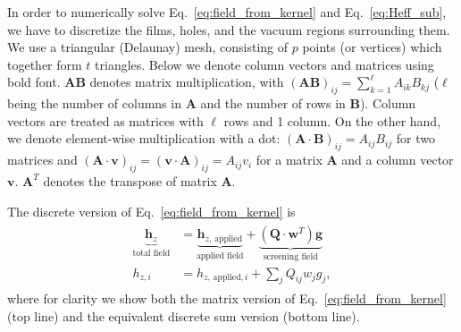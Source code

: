 \documentclass[final,3p,times,twocolumn]{elsarticle}
\begin{document}
In order to numerically solve Eq.~\ref{eq:field_from_kernel} and Eq.~\ref{eq:Heff_sub}, we have to discretize the films, holes, and the vacuum regions surrounding them. We use a triangular
(Delaunay) mesh, consisting of $p$ points (or vertices)
which together form $t$ triangles. Below we denote column vectors and matrices using bold font. $\mathbf{A}\mathbf{B}$
denotes matrix multiplication, with $(\mathbf{A}\mathbf{B})_{ij}=\sum_{k=1}^\ell A_{ik}B_{kj}$
($\ell$ being the number of columns in $\mathbf{A}$ and the number of rows in $\mathbf{B}$). Column vectors are treated as matrices with $\ell$ rows and 1 column. On the other hand, we denote element-wise multiplication with a dot: $(\mathbf{A}\cdot\mathbf{B})_{ij}=A_{ij}B_{ij}$ for two matrices
and $(\mathbf{A}\cdot\mathbf{v})_{ij}=(\mathbf{v}\cdot\mathbf{A})_{ij}=A_{ij}v_{i}$ for a matrix $\mathbf{A}$ and a column vector $\mathbf{v}$. $\mathbf{A}^T$ denotes the transpose of matrix $\mathbf{A}$.

The discrete version of Eq.~\ref{eq:field_from_kernel} is
\begin{align}
\begin{split}
    \label{eq:field_from_kernel_num}
    \underbrace{\mathbf{h}_z}_\text{total field}
    &= \underbrace{\mathbf{h}_{z,\,\mathrm{applied}}}_\text{applied field}
    + \underbrace{(\mathbf{Q}\cdot\mathbf{w}^T)\mathbf{g}}_\text{screening field}\\
    h_{z, i} &= h_{z,\,\mathrm{applied}, i} + \sum_j Q_{ij}w_jg_j,
\end{split}
\end{align}
where for clarity we show both the matrix version of Eq.~\ref{eq:field_from_kernel} (top line) and the equivalent discrete sum version (bottom line).
\end{document}
